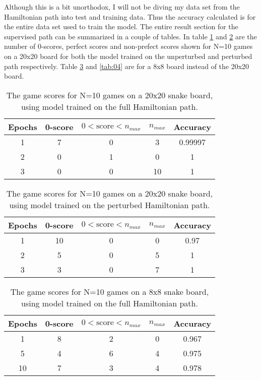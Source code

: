\documentclass[%
 uio,
 jmp,
 amsmath,amssymb,
 reprint, nofootinbib]{revtex4-1}
\numberwithin{equation}{section}
\begin{document}
Although this is a bit unorthodox, I will not be diving my data set from the Hamiltonian path into test and training data. Thus the accuracy calculated is for the entire data set used to train the model. The entire result section for the supervised path can be summarized in a couple of tables. In table \ref{tab:01} and \ref{tab:02} are the number of 0-scores, perfect scores and non-prefect scores shown for N=10 games on a 20x20 board for both the model trained on the unperturbed and perturbed path respectively. Table \ref{tab:03} and \ref{tab:04} are for a 8x8 board instead of the 20x20 board.

\begin{table}[H]
\caption{The game scores for N=10 games on a 20x20 snake board, using model trained on the full Hamiltonian path.}
\begin{tabular}{|c|c|c|c|c|}\hline
Epochs  & 0-score & \(0<\text{score}<n_{max}\) & \(n_{max}\) & Accuracy\\ \hline
1 & 7 & 0 & 3 & 0.99997\\ \hline
2 & 0 & 1 & 0 & 1\\ \hline
3 & 0 & 0 & 10 & 1\\ \hline
\end{tabular}
\label{tab:01}
\end{table}

\begin{table}[H]
\caption{The game scores for N=10 games on a 20x20 snake board, using model trained on the perturbed Hamiltonian path.}
\begin{tabular}{|c|c|c|c|c|}\hline
Epochs  & 0-score & \(0<\text{score}<n_{max}\) & \(n_{max}\) & Accuracy\\ \hline
1 & 10 & 0 & 0 & 0.97\\ \hline
2 & 5 & 0 & 5 & 1\\ \hline
3 & 3 & 0 & 7 & 1\\ \hline
\end{tabular}
\label{tab:02}
\end{table}

\begin{table}[H]
\caption{The game scores for N=10 games on a 8x8 snake board, using model trained on the full Hamiltonian path.}
\begin{tabular}{|c|c|c|c|c|}\hline
Epochs  & 0-score & \(0<\text{score}<n_{max}\) & \(n_{max}\) & Accuracy\\ \hline
1 & 8 & 2 & 0 & 0.967\\ \hline
5 & 4 & 6 & 4 & 0.975\\ \hline
10 & 7 & 3 & 4 & 0.978\\ \hline
\end{tabular}
\label{tab:03}
\end{table}
\end{document}
